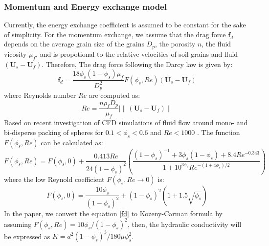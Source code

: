 \documentclass[preprint,12pt]{elsarticle}
\begin{document}
\subsubsection{Momentum and Energy exchange model}
Currently, the energy exchange coefficient is assumed to be constant for the sake of simplicity. For the momentum exchange, we assume that the drag force $\pmb{f}_{d}$ depends on the average grain size of the grains $D_p$, the porosity $n$, the fluid vicosity $\mu_f$, and is propotional to the relative velocities of soil grains and fluid $(\pmb{U}_s - \pmb{U}_f)$. Therefore, The drag force following the Darcy law is given by: \\
%
%
\begin{equation}
     \pmb{f}_{d} = \frac{18\phi_s(1-\phi_s)\mu_f}{D_p^2} F(\phi_s, Re) (\pmb{U}_s - \pmb{U}_f)  
\label{fd}
\end{equation}
%
%
where Reynolds number $Re$ are computed as:
%
%
\begin{equation}
     Re = \frac{n \rho_f D_p}{\mu_f} |\big\|(\pmb{U}_s - \pmb{U}_f)\big\|
\end{equation}
%
%
Based on recent investigation of CFD simulations of fluid flow around mono- and bi-disperse packing of spheres for $0.1 < \phi_s < 0.6$ and $Re < 1000$ \cite{Drag}. The function $F(\phi_s, Re)$ can be calculated as:
%
%
\begin{equation}
     F(\phi_s, Re)  = F(\phi_s, 0)  + \frac{0.413Re}{24 (1-\phi_s)^2} (\frac{(1-\phi_s)^{-1}+3\phi_s(1-\phi_s)+8.4Re^{-0.343}}{1+10^{3\phi_s}Re^{-(1+4\phi_s)/2}})
\end{equation}
%
%
where the low Reynold coefficient $ F(\phi_s, Re\rightarrow0)$ is:
%
%
\begin{equation}
     F(\phi_s, 0)  = \frac{10\phi_s}{ (1-\phi_s)^2}+(1-\phi_s)^2(1+1.5\sqrt{\phi_s})
\end{equation}
%
%
In the paper, we convert the equation \ref{fd} to Kozeny-Carman formula by assuming $F(\phi_s, Re) = 10\phi_s/(1-\phi_s)^2$, then, the hydraulic conductivity will be expressed as  $K = d^2 (1-\phi_s)^3 / 180 \mu \phi_s^2$.
\end{document}

